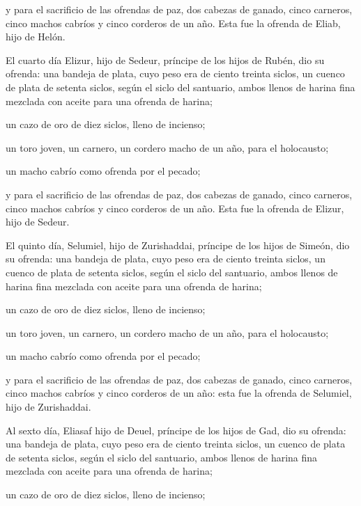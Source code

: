  y para el sacrificio de las ofrendas de paz, dos cabezas
de ganado, cinco carneros, cinco machos cabríos y cinco corderos de un
año. Esta fue la ofrenda de Eliab, hijo de Helón.

 El cuarto día Elizur, hijo de Sedeur, príncipe de los
hijos de Rubén,  dio su ofrenda: una bandeja de plata,
cuyo peso era de ciento treinta siclos, un cuenco de plata de setenta
siclos, según el siclo del santuario, ambos llenos de harina fina
mezclada con aceite para una ofrenda de harina;

 un cazo de oro de diez siclos, lleno de incienso;

 un toro joven, un carnero, un cordero macho de un año,
para el holocausto;

 un macho cabrío como ofrenda por el pecado;

 y para el sacrificio de las ofrendas de paz, dos cabezas
de ganado, cinco carneros, cinco machos cabríos y cinco corderos de un
año. Esta fue la ofrenda de Elizur, hijo de Sedeur.

 El quinto día, Selumiel, hijo de Zurishaddai, príncipe
de los hijos de Simeón,  dio su ofrenda: una bandeja de
plata, cuyo peso era de ciento treinta siclos, un cuenco de plata de
setenta siclos, según el siclo del santuario, ambos llenos de harina
fina mezclada con aceite para una ofrenda de harina;

 un cazo de oro de diez siclos, lleno de incienso;

 un toro joven, un carnero, un cordero macho de un año,
para el holocausto;

 un macho cabrío como ofrenda por el pecado;

 y para el sacrificio de las ofrendas de paz, dos cabezas
de ganado, cinco carneros, cinco machos cabríos y cinco corderos de un
año: esta fue la ofrenda de Selumiel, hijo de Zurishaddai.

 Al sexto día, Eliasaf hijo de Deuel, príncipe de los
hijos de Gad,  dio su ofrenda: una bandeja de plata, cuyo
peso era de ciento treinta siclos, un cuenco de plata de setenta siclos,
según el siclo del santuario, ambos llenos de harina fina mezclada con
aceite para una ofrenda de harina;

 un cazo de oro de diez siclos, lleno de incienso;

